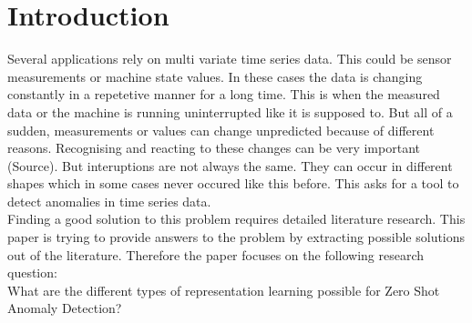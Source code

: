 \chapter{Introduction}\label{intro}
Several applications rely on multi variate time series data. This could be sensor measurements or machine state values. In these cases the data is changing constantly in a repetetive manner for a long time. This is when the measured data or the machine is running uninterrupted like it is supposed to. But all of a sudden, measurements or values can change unpredicted because of different reasons. Recognising and reacting to these changes can be very important (Source). But interuptions are not always the same. They can occur in different shapes which in some cases never occured like this before. This asks for a tool to detect anomalies in time series data.\\
Finding a good solution to this problem requires detailed literature research. This paper is trying to provide answers to the problem by extracting possible solutions out of the literature. Therefore the paper focuses on the following research question:\\
What are the different types of representation learning possible for Zero Shot Anomaly Detection?\\

